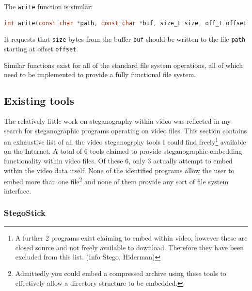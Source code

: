 \documentclass[paper=a4, fontsize=11pt,twoside]{scrartcl}
\numberwithin{table}{section}
\numberwithin{figure}{section}
\numberwithin{algorithm}{section}
\begin{document}
The \texttt{write} function is similar:

\begin{lstlisting}[language=C, caption={\texttt{FUSE} write operation.}, frame=single]
int write(const char *path, const char *buf, size_t size, off_t offset, struct fuse_file_info *fi);
\end{lstlisting}

\noindent
It requests that \texttt{size} bytes from the buffer \texttt{buf} should be written to the file \texttt{path} starting at offset \texttt{offset}.

Similar functions exist for all of the standard file system operations, all of which need to be implemented to provide a fully functional file system.

\subsection{Existing tools}
\label{tools}
The relatively little work on steganography within video was reflected in my search for steganographic programs operating on video files. This section contains an exhaustive list of all the video steganogrphy tools I could find freely\footnote{A further 2 programs exist claiming to embed within video, however these are closed source and not freely available to download. Therefore they have been excluded from this list. (Info Stego, Hiderman)} available on the Internet. A total of 6 tools claimed to provide steganographic embedding functionality within video files. Of these 6, only 3 actually attempt to embed within the video data itself. None of the identified programs allow the user to embed more than one file\footnote{Admittedly you could embed a compressed archive using these tools to effectively allow a directory structure to be embedded.}  and none of them provide any sort of file system interface.

\subsubsection{StegoStick}
\end{document}
